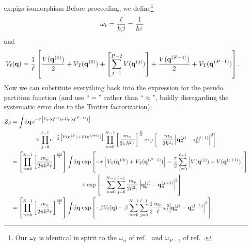 \begin{DefAnswer}{ex:pigs-isomorphism}
	Before proceeding, we define\footnote{
	Our $\omega_\ell$ is identical in spirit to the $\omega_n$ of ref.~\cite{ceriotti2010efficient} and $\omega_{P-1}$ of ref.~\cite{constable2013langevin}.
	}
	\begin{align}
		\omega_\ell
		&= \frac{\ell}{\hbar \beta}
		= \frac{1}{\hbar \tau}
			\label{eq:omega-links}
	\end{align}
	and
	\begin{align}
		V_\ell(\bm{\mathbf{q}})
		&= \frac{1}{\ell} \left[
				\frac{V(\bm{\mathbf{q}}^{(0)})}{2}
				+ V_\mathrm{T}(\bm{\mathbf{q}}^{(0)})
				+ \left[ \sum_{j=1}^{P-2} V(\bm{\mathbf{q}}^{(j)}) \right]
				+ \frac{V(\bm{\mathbf{q}}^{(P-1)})}{2}
				+ V_\mathrm{T}(\bm{\mathbf{q}}^{(P-1)})
			\right].
	\end{align}
	Now we can substitute everything back into the expression for the pseudo partition function (and use ``$=$'' rather than ``$\approx$'', boldly disregarding the systematic error due to the Trotter factorization):
	\begin{subequations}
	\begin{align}
		Z_\beta
		&= \int\! \dif \vec{q} \,
			e^{-\tau \left[ \VT(\vec{q}\bead{0}) + \VT(\vec{q}\bead{P-1}) \right]} \notag \\
		&\qquad\qquad\times
			\prod_{j=0}^{\links - 1}
				e^{-\frac{\tau}{2} \left[ V(\vec{q}\bead{j}) + V(\vec{q}\bead{j+1}) \right]}
				\prod_{n=0}^{N-1}
					\left[ \frac{m_n}{2 \pi \hbar^2 \tau} \right]^\frac{D}{2}
					\expb{
						-\frac{m_n}{2 \hbar^2 \tau} \abs{\vec{q}_n\bead{j} - \vec{q}_n\bead{j+1}}^2
					} \\
		&= \left[ \prod_{n=0}^{N-1} \left[ \frac{m_n}{2 \pi \hbar^2 \tau} \right]^\frac{\links D}{2} \right]
			\int\! \dif \vec{q} \,
				\expb{
					-\tau \left[ \VT(\vec{q}\bead{0}) + \VT(\vec{q}\bead{P-1}) \right]
					- \frac{\tau}{2} \sum_{j=0}^{\links - 1} \left[ V(\vec{q}\bead{j}) + V(\vec{q}\bead{j+1}) \right]
				} \notag \\
		&\qquad\qquad\qquad\qquad\qquad\qquad\times
				\expb{
					-\sum_{n=0}^{N-1} \sum_{j=0}^{\links - 1}
						\frac{m_n}{2 \hbar^2 \tau} \abs{\vec{q}_n\bead{j} - \vec{q}_n\bead{j+1}}^2
				} \\
		&= \left[ \prod_{n=0}^{N-1} \left[ \frac{m_n}{2 \pi \hbar^2 \tau} \right]^\frac{\links D}{2} \right]
			\int\! \dif \vec{q} \,
				\expb{
					-\beta V_\links(\vec{q})
					- \beta \sum_{n=0}^{N-1} \sum_{j=0}^{\links - 1}
						\frac{1}{2} \frac{m_n}{\links} \omega_\links^2 \abs{\vec{q}_n\bead{j} - \vec{q}_n\bead{j+1}}^2
				}.
	\end{align}

\end{subequations}
\end{DefAnswer}
